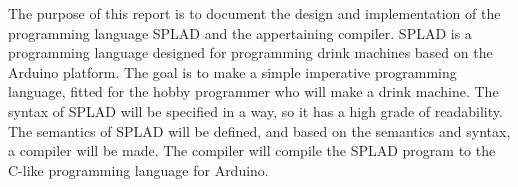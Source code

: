 The purpose of this report is to document the design and implementation of the programming language SPLAD and the appertaining compiler. SPLAD is a programming language designed for programming drink machines based on the Arduino platform. The goal is to make a simple imperative programming language, fitted for the hobby programmer who will make a drink machine. The syntax of SPLAD will be specified in a way, so it has a high grade of readability. The semantics of SPLAD will be defined, and based on the semantics and syntax, a compiler will be made. The compiler will compile the SPLAD program to the C-like programming language for Arduino.